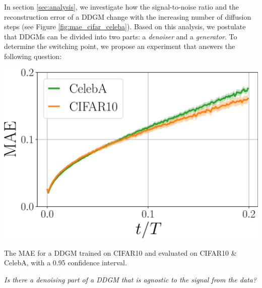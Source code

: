 In section \ref{sec:analysis}, we investigate how the signal-to-noise ratio and the reconstruction error of a DDGM change with the increasing number of diffusion steps (see Figure \ref{fig:mae_cifar_celeba}). Based on this analysis, we postulate that DDGMs can be divided into two parts: a \emph{denoiser} and a \emph{generator}. To determine the switching point, we propose an experiment that answers the following question:
\begin{marginfigure}
	\includegraphics[width=\linewidth]{pics/4_daed/experiments/MAE_step_cifar_celeba.pdf}
	\caption{The MAE for a DDGM trained on CIFAR10 and evaluated on CIFAR10 \& CelebA, with a 0.95 confidence interval.}
	\label{fig:mae_cifar_celeba}
\end{marginfigure}
\textit{Is there a denoising part of a DDGM that is agnostic to the signal from the data?}

